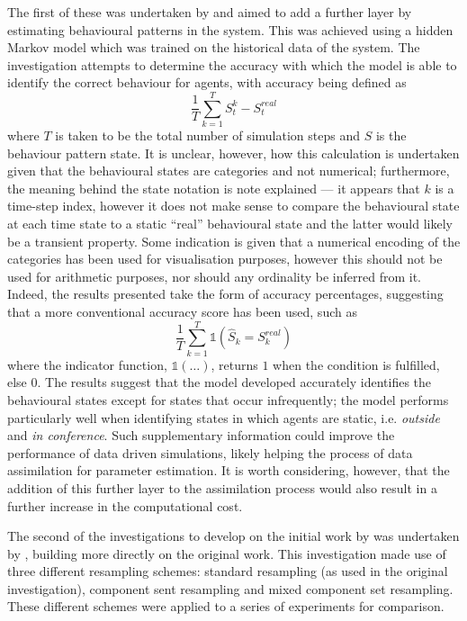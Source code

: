 The first of these was undertaken by \citet{rai2013behavior} and aimed to add a
further layer by estimating behavioural patterns in the system.
This was achieved using a hidden Markov model which was trained on the
historical data of the system.
The investigation attempts to determine the accuracy with which the model
is able to identify the correct behaviour for agents, with accuracy being
defined as
\begin{equation}
    \frac{1}{T} \sum_{k=1}^T S_{t}^{k} - S_{t}^{real}
\end{equation}
where $T$ is taken to be the total number of simulation steps and $S$ is the
behaviour pattern state.
It is unclear, however, how this calculation is undertaken given that the
behavioural states are categories and not numerical; furthermore, the meaning
behind the state notation is note explained --- it appears that $k$ is a time-step
index, however it does not make sense to compare the behavioural state at each
time state to a static ``real'' behavioural state and the latter would likely be
a transient property.
Some indication is given that a numerical encoding of the categories has been
used for visualisation purposes, however this should not be used for arithmetic
purposes, nor should any ordinality be inferred from it.
Indeed, the results presented take the form of accuracy percentages, suggesting
that a more conventional accuracy score has been used, such as
\begin{equation}
    \frac{1}{T} \sum_{k=1}^{T} \mathds{1} \left(
                \hat{S}_k = S_{k}^{real} \right)
\end{equation}
where the indicator function, $\mathds{1} \left( \ldots \right)$, returns $1$
when the condition is fulfilled, else $0$.
The results suggest that the model developed accurately identifies the
behavioural states except for states that occur infrequently; the model performs
particularly well when identifying states in which agents are static, i.e.
\textit{outside} and \textit{in conference}.
Such supplementary information could improve the performance of data driven
simulations, likely helping the process of data assimilation for parameter
estimation.
It is worth considering, however, that the addition of this further layer to the
assimilation process would also result in a further increase in the
computational cost.

The second of the investigations to develop on the initial work by
\citet{wang2013data} was undertaken by \citet{wang2015data}, building more
directly on the original work.
This investigation made use of three different resampling schemes: standard
resampling (as used in the original investigation), component sent resampling
and mixed component set resampling.
These different schemes were applied to a series of experiments for comparison.


